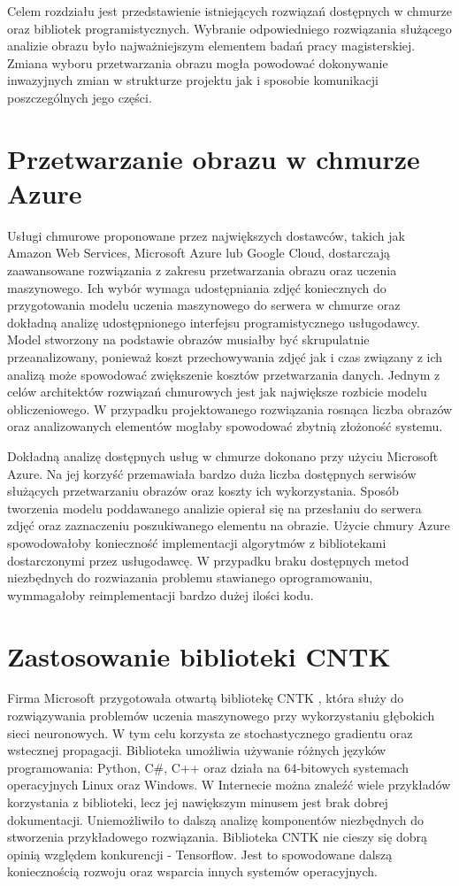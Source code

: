 Celem rozdziału jest przedstawienie istniejących rozwiązań dostępnych w chmurze oraz bibliotek programistycznych. Wybranie odpowiedniego rozwiązania służącego analizie obrazu było najważniejszym elementem badań pracy magisterskiej. Zmiana wyboru przetwarzania obrazu mogła powodować dokonywanie inwazyjnych zmian w strukturze projektu jak i sposobie komunikacji poszczególnych jego części. 

\section{Przetwarzanie obrazu w chmurze Azure} {
Usługi chmurowe proponowane przez największych dostawców, takich jak Amazon Web Services, Microsoft Azure lub Google Cloud, dostarczają zaawansowane rozwiązania z zakresu przetwarzania obrazu oraz uczenia maszynowego. Ich wybór wymaga udostępniania zdjęć koniecznych do przygotowania modelu uczenia maszynowego do serwera w chmurze oraz dokładną analizę udostępnionego interfejsu programistycznego usługodawcy. Model stworzony na podstawie obrazów musiałby być skrupulatnie przeanalizowany, ponieważ koszt przechowywania zdjęć jak i czas związany z ich analizą może spowodować zwiększenie kosztów przetwarzania danych. Jednym z celów architektów rozwiązań chmurowych jest jak największe rozbicie modelu obliczeniowego. W przypadku projektowanego rozwiązania rosnąca liczba obrazów oraz analizowanych elementów mogłaby spowodować zbytnią złożoność systemu. 

Dokładną analizę dostępnych usług w chmurze dokonano przy użyciu Microsoft Azure. Na jej korzyść przemawiała bardzo duża liczba dostępnych serwisów służących przetwarzaniu obrazów oraz koszty ich wykorzystania. Sposób tworzenia modelu poddawanego analizie opierał się na przesłaniu do serwera zdjęć oraz zaznaczeniu poszukiwanego elementu na obrazie. Użycie chmury Azure spowodowałoby konieczność implementacji algorytmów z bibliotekami dostarczonymi przez usługodawcę. W przypadku braku dostępnych metod niezbędnych do rozwiazania problemu stawianego oprogramowaniu, wymmagałoby reimplementacji bardzo dużej ilości kodu. 

\section{Zastosowanie biblioteki CNTK}{
Firma Microsoft przygotowała otwartą bibliotekę CNTK \cite{CNTK}, która służy do rozwiązywania problemów uczenia maszynowego przy wykorzystaniu głębokich sieci neuronowych. W tym celu korzysta ze stochastycznego gradientu oraz wstecznej propagacji. Biblioteka umożliwia używanie różnych języków programowania: Python, C\#, C++ oraz działa na 64-bitowych systemach operacyjnych Linux oraz Windows. W Internecie można znaleźć wiele przykładów korzystania z biblioteki, lecz jej nawiększym minusem jest brak dobrej dokumentacji. Uniemożliwiło to dalszą analizę komponentów niezbędnych do stworzenia przykładowego rozwiązania. Biblioteka CNTK nie cieszy się dobrą opinią względem konkurencji - Tensorflow. Jest to spowodowane dalszą koniecznością rozwoju oraz wsparcia innych systemów operacyjnych. 
}

}
